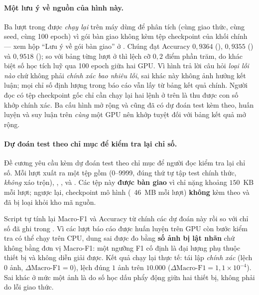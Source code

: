 \paragraph{Một lưu ý về nguồn của hình này.}
Ba lượt trong  được \emph{chạy lại} trên máy dùng để phân tích (cùng
giao thức, cùng seed, cùng 100 epoch) vì gói bàn giao không kèm tệp checkpoint của khối chính —
xem hộp \enquote{Lưu ý về gói bàn giao} ở . Chúng đạt Accuracy $0{,}9364$
(), $0{,}9355$ () và $0{,}9518$ (); so với bảng từng lượt ở
 thì lệch cỡ $0{,}2$ điểm phần trăm, do khác biệt số học tích luỹ
qua 100 epoch giữa hai GPU. Vì hình trả lời câu hỏi \emph{loại lỗi nào} chứ không phải
\emph{chính xác bao nhiêu lỗi}, sai khác này không ảnh hưởng kết luận; mọi chỉ số định lượng
trong báo cáo vẫn lấy từ bảng kết quả chính. Người đọc có tệp checkpoint gốc chỉ cần chạy lại
hai lệnh ở trên là thu được con số khớp chính xác. Ba cấu hình mở rộng  và 
cũng đã có dự đoán test kèm theo, huấn luyện và suy luận trên \emph{cùng} một GPU nên khớp
tuyệt đối với bảng kết quả mở rộng.

\paragraph{Dự đoán test theo chỉ mục để kiểm tra lại chỉ số.}
Đề cương yêu cầu kèm dự đoán test theo chỉ mục để người đọc kiểm tra lại chỉ số. Mỗi lượt xuất ra
một tệp  gồm  (0--9999, đúng thứ tự
tập test chính thức, \emph{không} xáo trộn), , ,  và
. Các tệp này \textbf{được bàn giao} vì chỉ nặng khoảng $150$~KB mỗi lượt; ngược lại,
checkpoint mô hình (~46~MB mỗi lượt) \textbf{không} kèm theo và đã bị  loại khỏi
kho mã nguồn.

Script tự tính lại Macro-F1 và Accuracy từ chính các dự đoán này rồi so với chỉ số đã ghi trong
. Vì các lượt báo cáo được huấn luyện trên GPU còn bước kiểm tra có thể chạy trên
CPU, dung sai được đo bằng \textbf{số ảnh bị lật nhãn} chứ không bằng đơn vị Macro-F1: một ngưỡng
F1 cố định là đại lượng phụ thuộc thiết bị và không diễn giải được. Kết quả chạy lại thực tế:
 tái lập \emph{chính xác} (lệch $0$ ảnh, $\Delta\text{Macro-F1} = 0$),  lệch đúng
$1$ ảnh trên $10.000$ ($\Delta\text{Macro-F1} = 1{,}1\times10^{-4}$). Sai khác ở mức một ảnh là do
số học dấu phẩy động giữa hai thiết bị, không phải do lỗi giao thức.

